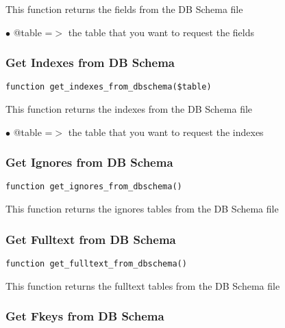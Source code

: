 \documentclass[a4paper]{article}
\begin{document}
This function returns the fields from the DB Schema file

\begin{compactitem}
\item[\color{myblue}$\bullet$] @table =$>$ the table that you want to request the fields
\end{compactitem}

\hypertarget{toc417}{}
\subsubsection{Get Indexes from DB Schema}

\begin{lstlisting}
function get_indexes_from_dbschema($table)
\end{lstlisting}

This function returns the indexes from the DB Schema file

\begin{compactitem}
\item[\color{myblue}$\bullet$] @table =$>$ the table that you want to request the indexes
\end{compactitem}

\hypertarget{toc418}{}
\subsubsection{Get Ignores from DB Schema}

\begin{lstlisting}
function get_ignores_from_dbschema()
\end{lstlisting}

This function returns the ignores tables from the DB Schema file

\hypertarget{toc419}{}
\subsubsection{Get Fulltext from DB Schema}

\begin{lstlisting}
function get_fulltext_from_dbschema()
\end{lstlisting}

This function returns the fulltext tables from the DB Schema file

\hypertarget{toc420}{}
\subsubsection{Get Fkeys from DB Schema}
\end{document}
